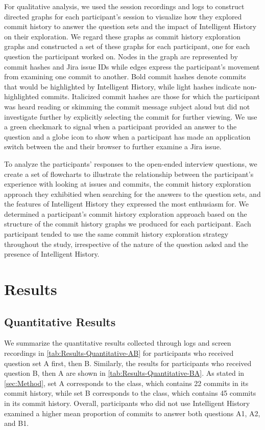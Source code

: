 For qualitative analysis, we used the session recordings and logs to construct directed graphs for each participant's session to visualize how they explored commit history to answer the question sets and the impact of Intelligent History on their exploration.
We regard these graphs as commit history exploration graphs and constructed a set of these graphs for each participant, one for each question the participant worked on.
Nodes in the graph are represented by commit hashes and Jira issue IDs while edges express the participant's movement from examining one commit to another.
Bold commit hashes denote commits that would be highlighted by Intelligent History, while light hashes indicate non-highlighted commits.
Italicized commit hashes are those for which the participant was heard reading or skimming the commit message subject aloud but did not investigate further by explicitly selecting the commit for further viewing.
We use a green checkmark to signal when a participant provided an answer to the question and a globe icon to show when a participant has made an application switch between the  and their browser to further examine a Jira issue.

To analyze the participants' responses to the open-ended interview questions, we create a set of flowcharts to illustrate the relationship between the participant's experience with looking at issues and commits,
the commit history exploration approach they exhibitied when searching for the answers to the question sets, and the features of Intelligent History they expressed the most enthusiasm for.
We determined a participant's commit history exploration approach based on the structure of the commit history graphs we produced for each participant.
Each participant tended to use the same commit history exploration strategy throughout the study, irrespective of the nature of the question asked and the presence of Intelligent History.

\section{Results}
\label{sec:Results}

\subsection{Quantitative Results}

We summarize the quantitative results collected through logs and screen recordings in \autoref{tab:Results-Quantitative-AB} for participants who received question set A first, then B.
Similarly, the results for participants who received question B, then A are shown in \autoref{tab:Results-Quantitative-BA}.
As stated in \autoref{sec:Method}, set A corresponds to the  class, which contains 22 commits in its commit history, 
while set B corresponds to the  class, which contains 45 commits in its commit history.
Overall, participants who did not use Intelligent History examined a higher mean proportion of commits to answer both questions A1, A2, and B1.

